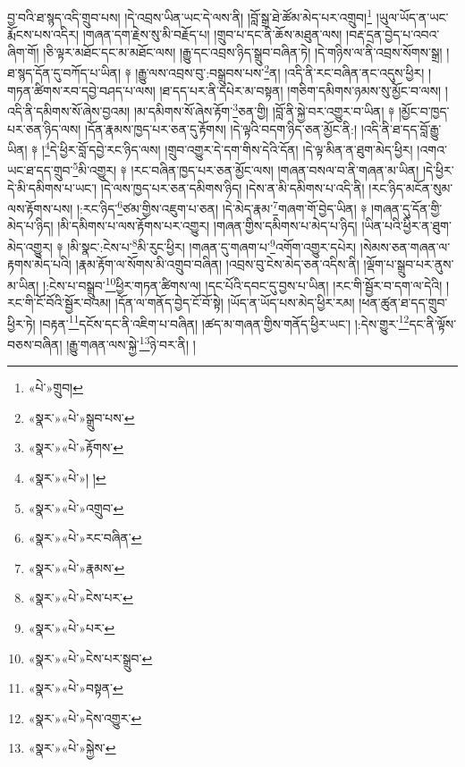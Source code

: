 བྱ་བའི་ཐ་སྙད་འདི་གྲུབ་པས། །དེ་འབྲས་ཡིན་ཡང་དེ་ལས་ནི། །བློ་སྒྲ་ཐེ་ཚོམ་མེད་པར་འགྲུབ།\footnote{«པེ་»གྲུབ།} །ཡུལ་ཡོད་ན་ཡང་རྨོངས་པས་འདིར། །གཞན་དག་རྗེས་སུ་མི་བརྗོད་པ། །གྲུབ་པ་དང་ནི་ཆོས་མཐུན་ལས། །བརྡ་དྲན་བྱེད་པ་འབའ་ཞིག་གོ། །ཅི་ལྟར་མཐོང་དང་མ་མཐོང་ལས། །རྒྱུ་དང་འབྲས་ཉིད་སྒྲུབ་བཞིན་ཏེ། །དེ་གཉིས་ལ་ནི་འབྲས་སོགས་སྒྲ། །ཐ་སྙད་དོན་དུ་བཀོད་པ་ཡིན། ༈ །རྒྱུ་ལས་འབྲས་བུ་:བསྒྲུབས་པས་\footnote{«སྣར་»«པེ་»སྒྲུབ་པས་}ན། །འདི་ནི་རང་བཞིན་ནང་འདུས་ཕྱིར། །གཏན་ཚིགས་རབ་དབྱེ་བཤད་པ་ལས། །ཐ་དད་པར་ནི་དཔེར་མ་བསྟན། །གཅིག་དམིགས་ཉམས་སུ་མྱོང་བ་ལས། །འདི་ནི་དམིགས་སོ་ཞེས་བྱའམ། །མ་དམིགས་སོ་ཞེས་རྟོག་\footnote{«སྣར་»«པེ་»རྟོགས་}ཅན་གྱི། །བློ་ནི་སྐྱེ་བར་འགྱུར་བ་ཡིན། ༈ །མྱོང་བ་ཁྱད་པར་ཅན་ཉིད་ལས། །དོན་རྣམས་ཁྱད་པར་ཅན་དུ་རྟོགས། །དེ་ལྟའི་བདག་ཉིད་ཅན་མྱོང་ནི:། །འདི་ནི་ཐ་དད་བློ་རྒྱུ་ཡིན། ༈ །\footnote{«སྣར་»«པེ་»། །}དེ་ཕྱིར་བློ་དབྱེ་རང་ཉིད་ལས། །གྲུབ་འགྱུར་དེ་དག་གིས་དེའི་དོན། །དེ་ལྟ་མིན་ན་ཐུག་མེད་ཕྱིར། །འགའ་ཡང་ཐ་དད་གྲུབ་\footnote{«སྣར་»«པེ་»འགྲུབ་}མི་འགྱུར། ༈ །རང་བཞིན་ཁྱད་པར་ཅན་མྱོང་ལས། །གཞན་བསལ་བ་ནི་གཞན་མ་ཡིན། །དེ་ཕྱིར་དེ་མི་དམིགས་པ་ཡང་། །དེ་ལས་ཁྱད་པར་ཅན་དམིགས་ཉིད། །དེས་ན་མི་དམིགས་པ་འདི་ནི། །རང་ཉིད་མངོན་སུམ་ལས་རྟོགས་པས། །:རང་ཉིད་\footnote{«སྣར་»«པེ་»རང་བཞིན་}ཙམ་གྱིས་འཇུག་པ་ཅན། །དེ་མེད་རྣམ་\footnote{«སྣར་»«པེ་»རྣམས་}གཞག་གོ་བྱེད་ཡིན། ༈ །གཞན་དུ་དོན་གྱི་མེད་པ་ཉིད། །མི་དམིགས་པ་ལས་རྟོགས་པར་འགྱུར། །གཞན་གྱིས་དམིགས་པ་མེད་པ་ཉིད། །ཡིན་པའི་ཕྱིར་ན་ཐུག་མེད་འགྱུར། ༈ །མི་སྣང་:ངེས་པ་\footnote{«སྣར་»«པེ་»ངེས་པར་}མི་རུང་ཕྱིར། །གཞན་དུ་གཞག་པ་\footnote{«སྣར་»«པེ་»པར་}འགོག་འགྱུར་དཔེར། །སེམས་ཅན་གཞན་ལ་རྟགས་མེད་པའི། །རྣམ་རྟོག་ལ་སོགས་མི་འགྲུབ་བཞིན། །འབྲས་བུ་ངེས་མེད་ཅན་འདིས་ནི། །ལྡོག་པ་སྒྲུབ་པར་ནུས་མ་ཡིན། །:ངེས་པ་བསྒྲུབ་\footnote{«སྣར་»«པེ་»ངེས་པར་སྒྲུབ་}ཕྱིར་གཏན་ཚིགས་ལ། །དང་པོའི་དབང་དུ་བྱས་པ་ཡིན། །རང་གི་སྦྱོར་བ་དག་ལ་དེའི། །རང་གི་ངོ་བོའི་སྦྱོར་བའམ། །དོན་ལ་གནོད་བྱེད་ངོ་བོ་སྟེ། །ཡོད་ན་ཡོད་པས་མེད་ཕྱིར་རམ། །ཕན་ཚུན་ཐ་དད་གྲུབ་ཕྱིར་ཏེ། །བརྟན་\footnote{«སྣར་»«པེ་»བསྟན་}དངོས་དང་ནི་འཇིག་པ་བཞིན། །ཚད་མ་གཞན་གྱིས་གནོད་ཕྱིར་ཡང་། །:དེས་གྱུར་\footnote{«སྣར་»«པེ་»དེས་འགྱུར་}དང་ནི་ལྟོས་བཅས་བཞིན། །རྒྱུ་གཞན་ལས་སྐྱེ་\footnote{«སྣར་»«པེ་»སྐྱེས་}ཉེ་བར་ནི། །
